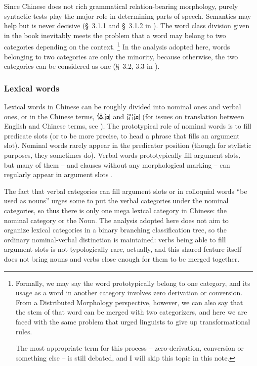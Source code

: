 \documentclass[UTF8, a4paper, oneside, scheme=plain]{ctexart}
\newcommand*{\citesec}[1]{\S~{#1}}
\begin{document}
Since Chinese does not rich grammatical relation-bearing morphology,
purely syntactic tests play the major role in determining parts of speech.
Semantics may help but is never decisive 
(\citesec{3.1.1} and \citesec{3.1.2} in \citet{zhudexigrammar}).
The word class division given in the book inevitably meets the problem 
that a word may belong to two categories depending on the context.%
\footnote{
    Formally, we may say the word prototypically belong to one category,
    and its usage as a word in another category
    involves zero derivation or conversion.
    From a Distributed Morphology perspective,
    however, we can also say that the stem of that word can be merged with 
    two categorizers, 
    and here we are faced with the same problem that 
    urged linguists to give up transformational rules.

    The most appropriate term for this process -- 
    zero-derivation, conversion or something else -- is still debated,
    and I will skip this topic in this note.
}
In the analysis adopted here, words belonging to two categories are only the minority,
because otherwise, the two categories can be considered as one 
(\citesec{3.2, 3.3} in \citet{zhudexigrammar}).

\subsubsection{Lexical words}

Lexical words in Chinese can be roughly divided into nominal ones and verbal ones,
or in the Chinese terms, 体词 and 谓词
(for issues on translation between English and Chinese terms, see ).
The prototypical role of nominal words 
is to fill predicate slots (or to be more precise, to head a phrase that fills an argument slot).
Nominal words rarely appear in the predicator position
(though for stylistic purposes, they sometimes do).
Verbal words prototypically fill argument slots,
but many of them -- and clauses without any morphological marking -- 
can regularly appear in argument slots \citep[\citesec{3.5}]{zhudexigrammar}.

The fact that verbal categories can fill argument slots or in colloquial words ``be used as nouns''
urges some to put the verbal categories under the nominal categories,
so thus there is only one mega lexical category in Chinese:
the nominal category or the Noun.
The analysis adopted here does not aim to organize lexical categories 
in a binary branching classification tree,
so the ordinary nominal-verbal distinction is maintained:
verbs being able to fill argument slots is not typologically rare, actually,
and this shared feature itself does not bring nouns and verbs close enough 
for them to be merged together.
\end{document}
